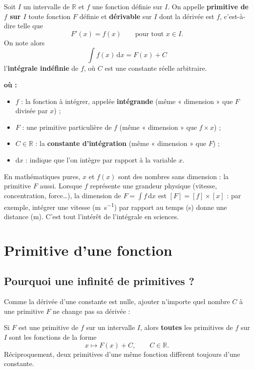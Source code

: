 \documentclass[11pt,a4paper]{article}
\newenvironment{ou}{%
  \par\smallskip\noindent\textbf{où :}\nopagebreak
  \begin{itemize}[leftmargin=1.8em,topsep=2pt,itemsep=1.5pt,parsep=0pt]}%
  {\end{itemize}}
\newcommand{\dd}{\mathrm{d}}
\newcommand{\R}{\mathbb{R}}
\begin{document}
\begin{definition}
Soit $I$ un intervalle de $\R$ et $f$ une fonction définie sur $I$. On appelle
\textbf{primitive de $f$ sur $I$} toute fonction $F$ définie et \textbf{dérivable} sur $I$ dont la
dérivée est $f$, c'est-à-dire telle que
\[ F'(x)=f(x)\qquad\text{pour tout }x\in I. \]
On note alors
\[ \boxed{\;\int f(x)\,\dd x = F(x)+C\;} \]
l'\textbf{intégrale indéfinie} de $f$, où $C$ est une constante réelle arbitraire.
\begin{ou}
  \item $f$ : la fonction à intégrer, appelée \textbf{intégrande} (même « dimension » que $F$ divisée par $x$) ;
  \item $F$ : une primitive particulière de $f$ (même « dimension » que $f\times x$) ;
  \item $C\in\R$ : la \textbf{constante d'intégration} (même « dimension » que $F$) ;
  \item $\dd x$ : indique que l'on intègre par rapport à la variable $x$.
\end{ou}
\end{definition}

En mathématiques pures, $x$ et $f(x)$ sont des nombres sans dimension : la primitive $F$ aussi.
Lorsque $f$ représente une grandeur physique (vitesse, concentration, force\dots), la dimension de
$F=\int f\,\dd x$ est $[F]=[f]\times[x]$ : par exemple, intégrer une vitesse (\si{\metre\per\second})
par rapport au temps (\si{\second}) donne une distance (\si{\metre}). C'est tout l'intérêt de
l'intégrale en sciences.

\section{Primitive d'une fonction}

\subsection{Pourquoi une infinité de primitives ?}

Comme la dérivée d'une constante est nulle, ajouter n'importe quel nombre $C$ à une primitive $F$
ne change pas sa dérivée :

\begin{theoreme}
Si $F$ est une primitive de $f$ sur un intervalle $I$, alors \textbf{toutes} les primitives de $f$
sur $I$ sont les fonctions de la forme
\[ \boxed{\;x\longmapsto F(x)+C,\qquad C\in\R.\;} \]
Réciproquement, deux primitives d'une même fonction diffèrent toujours d'une constante.
\end{theoreme}
\end{document}
